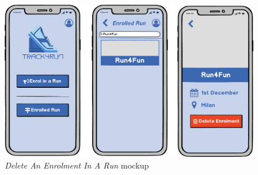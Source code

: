 \begin{figure}[H]
\begin{center}
  \includegraphics[width=\textwidth]{img/mockup/DeleteEnrolment.png}
  \hspace{0.05\linewidth}
  \centering
  \caption{\textit{Delete An Enrolment In A Run} mockup}
  \label{img:deleteEnrolmentMockup}
\end{center}
\end{figure}

